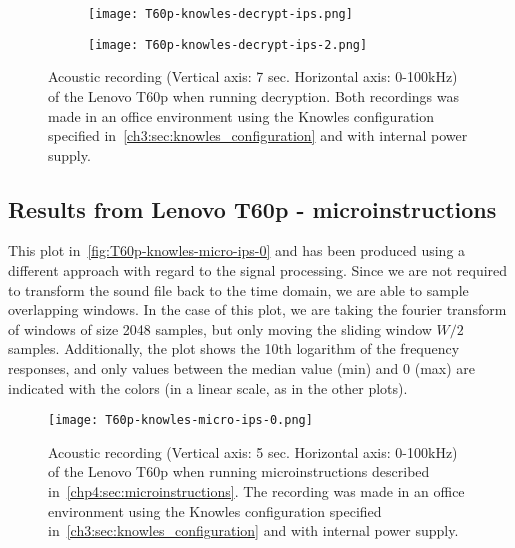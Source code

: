 \begin{figure}[ht]
    \begin{subfigure}{0.8\textwidth}
        \centering
        \texttt{[image: T60p-knowles-decrypt-ips.png]}
        \caption{}
        \label{fig:T60p-knowles-decrypt-ips}
    \end{subfigure}
    \begin{subfigure}{0.8\textwidth}
        \centering
        \texttt{[image: T60p-knowles-decrypt-ips-2.png]}
        \caption{}
        \label{fig:T60p-knowles-decrypt-ips-2}
    \end{subfigure}
    \caption{Acoustic recording (Vertical axis: 7 sec. Horizontal axis: 0-100kHz) of the Lenovo T60p when running decryption.
    Both recordings was made in an office environment using the Knowles configuration specified in~\autoref{ch3:sec:knowles_configuration} and with internal power supply. }
    \label{fig:T60p-knowles-decrypt-ips}
\end{figure}

\subsection{Results from Lenovo T60p - microinstructions}\label{chp5:subsec:t60p_knowles_results_micro}
This plot in~\autoref{fig:T60p-knowles-micro-ips-0} and has been produced using a different approach with regard to the signal processing. 
Since we are not required to transform the sound file back to the time domain, we are able to sample overlapping windows.
In the case of this plot, we are taking the fourier transform of windows of size 2048 samples, but only moving the sliding window \({W/2}\) samples.
Additionally, the plot shows the 10th logarithm of the frequency responses, and only values between the median value (min) and 0 (max) are indicated with the colors (in a linear scale, as in the other plots). 
\begin{figure}[ht]
    \centering
    \texttt{[image: T60p-knowles-micro-ips-0.png]}
    \caption{Acoustic recording (Vertical axis: 5 sec. Horizontal axis: 0-100kHz) of the Lenovo T60p when running microinstructions described in~\autoref{chp4:sec:microinstructions}. The recording was made in an office environment using the Knowles configuration specified in~\autoref{ch3:sec:knowles_configuration} and with internal power supply. }
    \label{fig:T60p-knowles-micro-ips-0}
\end{figure}
